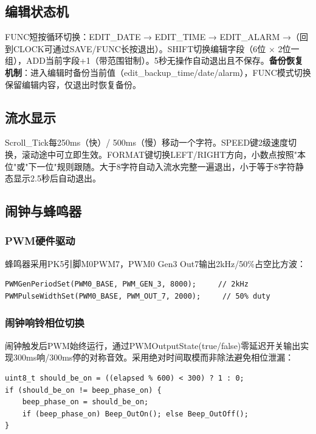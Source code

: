 \documentclass[12pt,hyperref,a4paper,UTF8]{ctexart}
\begin{document}
\subsection{编辑状态机}

FUNC短按循环切换：EDIT\_DATE → EDIT\_TIME → EDIT\_ALARM →（回到CLOCK可通过SAVE/FUNC长按退出）。SHIFT切换编辑字段（6位 × 2位一组），ADD当前字段+1（带范围钳制）。5秒无操作自动退出且不保存。\textbf{备份恢复机制}：进入编辑时备份当前值（edit\_backup\_time/date/alarm），FUNC模式切换保留编辑内容，仅退出时恢复备份。

\subsection{流水显示}

Scroll\_Tick每250ms（快）/ 500ms（慢）移动一个字符。SPEED键2级速度切换，滚动途中可立即生效。FORMAT键切换LEFT/RIGHT方向，小数点按照"本位"或"下一位"规则跟随。大于8字符自动入流水完整一遍退出，小于等于8字符静态显示2.5秒后自动退出。

\subsection{闹钟与蜂鸣器}

\subsubsection{PWM硬件驱动}

蜂鸣器采用PK5引脚M0PWM7，PWM0 Gen3 Out7输出2kHz/50\%占空比方波：

\begin{verbatim}
PWMGenPeriodSet(PWM0_BASE, PWM_GEN_3, 8000);     // 2kHz
PWMPulseWidthSet(PWM0_BASE, PWM_OUT_7, 2000);     // 50% duty
\end{verbatim}

\subsubsection{闹钟响铃相位切换}

闹钟触发后PWM始终运行，通过PWMOutputState(true/false)零延迟开关输出实现300ms响/300ms停的对称音效。采用绝对时间取模而非除法避免相位泄漏：

\begin{verbatim}
uint8_t should_be_on = ((elapsed % 600) < 300) ? 1 : 0;
if (should_be_on != beep_phase_on) {
    beep_phase_on = should_be_on;
    if (beep_phase_on) Beep_OutOn(); else Beep_OutOff();
}
\end{verbatim}
\end{document}
